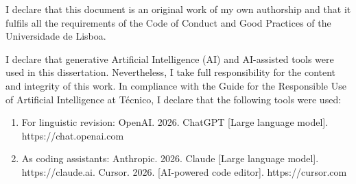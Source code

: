 \documentclass[defaultstyle,10pt,Helvetica]{istulthesis}
\begin{document}



I declare that this document is an original work of my own authorship and that it fulfils all the requirements of the Code of Conduct and Good Practices of the Universidade de Lisboa.

I declare that generative Artificial Intelligence (AI) and AI-assisted tools were used in this dissertation. Nevertheless, I take full responsibility for the content and integrity of this work. In compliance with the Guide for the Responsible Use of Artificial Intelligence at Técnico, I declare that the following tools were used:
\begin{enumerate}
	\item For linguistic revision: OpenAI. 2026. ChatGPT [Large language model]. https://chat.openai.com
	\item As coding assistants: Anthropic. 2026. Claude [Large language model]. https://claude.ai. Cursor. 2026. [AI-powered code editor]. https://cursor.com
\end{enumerate}



\clearpage
\end{document}
